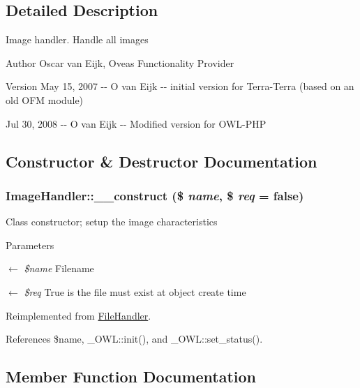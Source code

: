 \subsection{Detailed Description}
Image handler. Handle all images \begin{DoxyAuthor}{Author}
Oscar van Eijk, Oveas Functionality Provider 
\end{DoxyAuthor}
\begin{DoxyVersion}{Version}
May 15, 2007 -\/-\/ O van Eijk -\/-\/ initial version for Terra-\/Terra (based on an old OFM module) 

Jul 30, 2008 -\/-\/ O van Eijk -\/-\/ Modified version for OWL-\/PHP 
\end{DoxyVersion}


\subsection{Constructor \& Destructor Documentation}
\subsubsection[{\_\-\_\-construct}]{\setlength{\rightskip}{0pt plus 5cm}ImageHandler::\_\-\_\-construct (\$ {\em name}, \/  \$ {\em req} = {\ttfamily false})}\label{classImageHandler_aa61dc81d4cf98eed31b32e2197018309}
Class constructor; setup the image characteristics


\begin{DoxyParams}{Parameters}
\item[\mbox{$\leftarrow$} {\em \$name}]Filename \item[\mbox{$\leftarrow$} {\em \$req}]True is the file must exist at object create time \end{DoxyParams}


Reimplemented from \hyperlink{classFileHandler_a8d75c8ea0c532acdeae0a0a4efa3704a}{FileHandler}.



References \$name, \_\-OWL::init(), and \_\-OWL::set\_\-status().



\subsection{Member Function Documentation}
